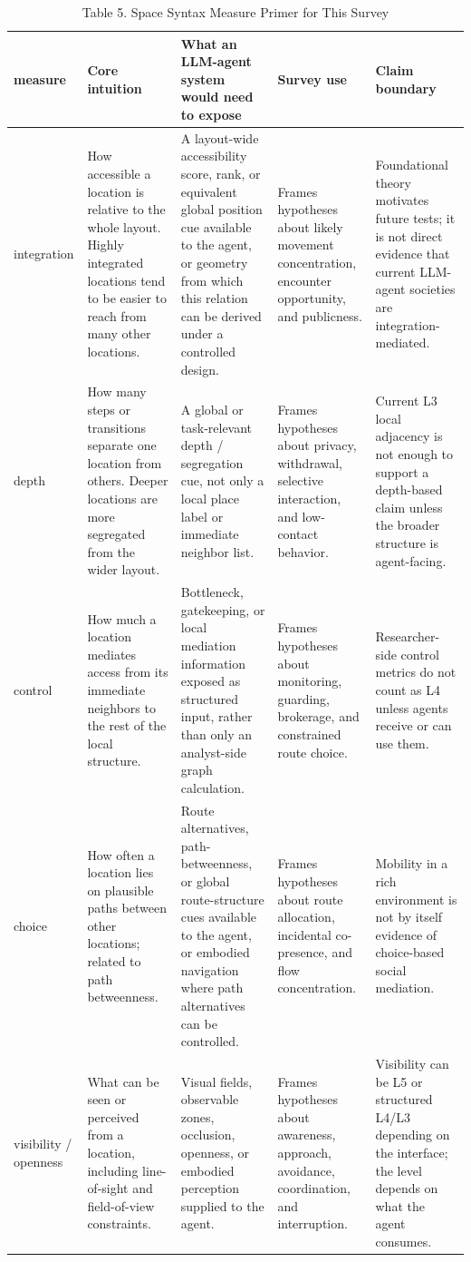 \documentclass[
  twocolumn]{article}
\begin{document}
\begin{table}[t]
\centering
\caption{Table 5. Space Syntax Measure Primer for This Survey}
\scriptsize
\setlength{\tabcolsep}{3pt}
\renewcommand{\arraystretch}{1.12}
\begin{tabular}{@{}>{\raggedright\arraybackslash}p{}|>{\raggedright\arraybackslash}p{}|>{\raggedright\arraybackslash}p{}|>{\raggedright\arraybackslash}p{}|>{\raggedright\arraybackslash}p{}@{}}
\toprule
measure & Core intuition & What an LLM-agent system would need to expose & Survey use & Claim boundary \\
\midrule
integration & How accessible a location is relative to the whole layout. Highly integrated locations tend to be easier to reach from many other locations. & A layout-wide accessibility score, rank, or equivalent global position cue available to the agent, or geometry from which this relation can be derived under a controlled design. & Frames hypotheses about likely movement concentration, encounter opportunity, and publicness. & Foundational theory motivates future tests; it is not direct evidence that current LLM-agent societies are integration-mediated. \\
depth & How many steps or transitions separate one location from others. Deeper locations are more segregated from the wider layout. & A global or task-relevant depth / segregation cue, not only a local place label or immediate neighbor list. & Frames hypotheses about privacy, withdrawal, selective interaction, and low-contact behavior. & Current L3 local adjacency is not enough to support a depth-based claim unless the broader structure is agent-facing. \\
control & How much a location mediates access from its immediate neighbors to the rest of the local structure. & Bottleneck, gatekeeping, or local mediation information exposed as structured input, rather than only an analyst-side graph calculation. & Frames hypotheses about monitoring, guarding, brokerage, and constrained route choice. & Researcher-side control metrics do not count as L4 unless agents receive or can use them. \\
choice & How often a location lies on plausible paths between other locations; related to path betweenness. & Route alternatives, path-betweenness, or global route-structure cues available to the agent, or embodied navigation where path alternatives can be controlled. & Frames hypotheses about route allocation, incidental co-presence, and flow concentration. & Mobility in a rich environment is not by itself evidence of choice-based social mediation. \\
visibility / openness & What can be seen or perceived from a location, including line-of-sight and field-of-view constraints. & Visual fields, observable zones, occlusion, openness, or embodied perception supplied to the agent. & Frames hypotheses about awareness, approach, avoidance, coordination, and interruption. & Visibility can be L5 or structured L4/L3 depending on the interface; the level depends on what the agent consumes. \\
\bottomrule
\end{tabular}


\end{table}
\end{document}
